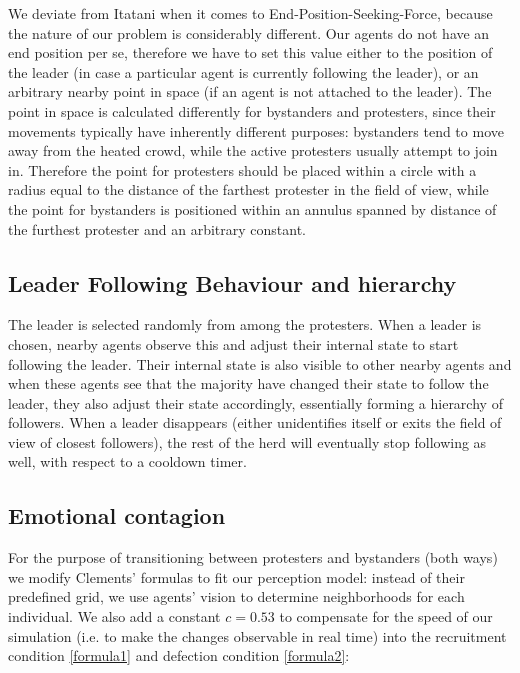 \documentclass[9pt]{pnas-new}
\begin{document}
\bigskip
We deviate from Itatani \cite{socialcrowdsimulation} when it comes to End-Position-Seeking-Force, because the nature of our problem is considerably different. Our agents do not have an end position per se, therefore we have to set this value either to the position of the leader (in case a particular agent is currently following the leader), or an arbitrary nearby point in space (if an agent is not attached to the leader). The point in space is calculated differently for bystanders and protesters, since their movements typically have inherently different purposes: bystanders tend to move away from the heated crowd, while the active protesters usually attempt to join in. Therefore the point for protesters should be placed within a circle with a radius equal to the distance of the farthest protester in the field of view, while the point for bystanders is positioned within an annulus spanned by distance of the furthest protester and an arbitrary constant. 

\subsection*{Leader Following Behaviour and hierarchy} 

The leader is selected randomly from among the protesters. When a leader is chosen, nearby agents observe this and adjust their internal state to start following the leader. Their internal state is also visible to other nearby agents and when these agents see that the majority have changed their state to follow the leader, they also adjust their state accordingly, essentially forming a hierarchy of followers. When a leader disappears (either unidentifies itself or exits the field of view of closest followers), the rest of the herd will eventually stop following as well, with respect to a cooldown timer. 

\subsection*{Emotional contagion}

For the purpose of transitioning between protesters and bystanders (both ways) we modify Clements' formulas to fit our perception model: instead of their predefined grid, we use agents' vision to determine neighborhoods for each individual. We also add a constant $c=0.53$ to compensate for the speed of our simulation (i.e. to make the changes observable in real time) into the recruitment condition \ref{formula1} and defection condition \ref{formula2}:
\end{document}
